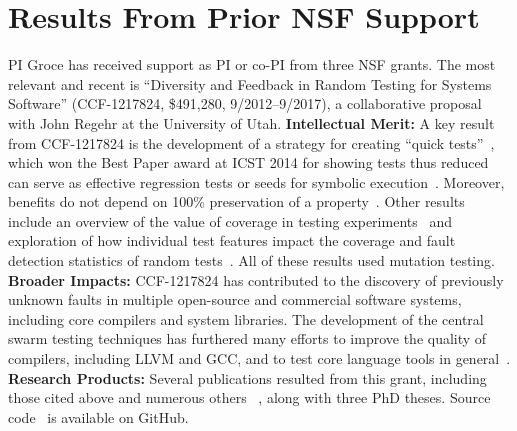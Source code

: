 \section{Results From Prior NSF Support}

PI Groce has received support as PI or co-PI from three NSF grants.
The most relevant and recent is ``Diversity and Feedback in Random
Testing for Systems Software'' (CCF-1217824,
\$491,280, 9/2012--9/2017), a collaborative proposal with John Regehr at the
University of Utah.
{\bf Intellectual Merit:} 
A key result from CCF-1217824
is the development of a strategy for creating ``quick tests''~\cite{icst2014cause}, which won the
Best Paper award at ICST 2014 for showing tests thus
reduced can serve as effective regression tests or seeds for
symbolic execution~\cite{stvrcausereduce, issta14symbolic}.  Moreover, benefits do not depend on 100\%
preservation of a property~\cite{AlipourETAL16TestReduction}.   Other results include an overview of the value of coverage in
testing experiments~\cite{Onward14} and exploration of how individual
test features impact the coverage and fault detection statistics of
random tests~\cite{helphelp}.  
All of these results used
mutation testing.  {\bf Broader Impacts:} CCF-1217824 has contributed to the discovery of previously
unknown faults in multiple open-source and commercial software
systems, including core compilers and system libraries.  The
development of the central swarm testing techniques
has furthered many efforts to improve
the quality of compilers, including LLVM and GCC, and to test core language
tools in
general~\cite{ZhendongPLDI14,beginnerluck,dewey2015fuzzing,le2015randomized}. {\bf
  Research
Products:} Several publications resulted from this grant, including
those cited above and numerous others ~\cite{Onward14,PLDI13fuzzing,issta14symbolic,icst2014cause,helphelp,DirectedSwarm,stvrcausereduce,tstlsttt,tstlISSTA15,AlipourETAL16TestReduction,tstlsttt,tstlNFM15},
along with three PhD theses.  Source code~\cite{swarmtools,TSTL}  is
available on GitHub.